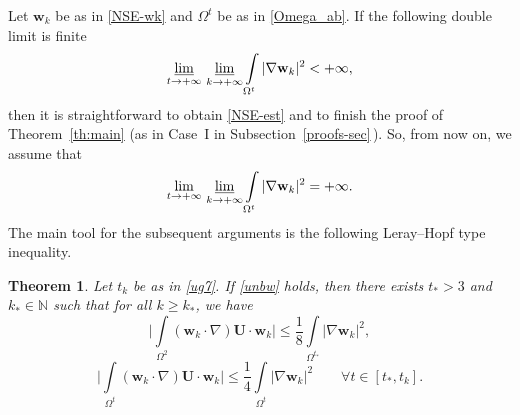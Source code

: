 \documentclass[11pt]{article}
\newtheorem{theorem}{Theorem}[section]
\numberwithin{equation}{section}
\numberwithin{figure}{section}
\newcommand{\N}{\mathbb{N}}
\def\N{{\mathbb N}}
\def\we{{\mathbf w}}
\begin{document}
Let $\we_k$ be as in \eqref{NSE-wk} and $\Omega^t$ be as in \eqref{Omega_ab}.
If the following double limit is finite
$$
\varliminf_{t\to +\infty} \, \varliminf_{k\to +\infty} \int\limits_{\Omega^t}|\nabla\we_{k}|^2 < +\infty,
$$
then it is straightforward to obtain \eqref{NSE-est} and to finish the proof of Theorem~\ref{th:main} (as in Case~I in \linebreak Subsection~\ref{proofs-sec}\,). So, from now on, we assume that
\begin{equation}\label{unbw}
	\lim_{t\to +\infty} \, \varliminf_{k\to +\infty} \int\limits_{\Omega^t}|\nabla\we_{k}|^2 = +\infty.
\end{equation}
The main tool for the subsequent arguments is the following Leray--Hopf type inequality. 

\begin{theorem}\label{prep-l2}
Let $t_k$ be as in \eqref{ug7}. If \eqref{unbw} holds, then there exists $t_*>3$ and $k_*\in\N$ such that
	for all $k\ge k_*$, we have
	\begin{equation}\label{gg11}\biggl|\int\limits_{\Omega^2}(\mathbf{w}_k \cdot \nabla) \mathbf{U}\cdot\we_k\biggr|\le
		\frac18\int\limits_{\Omega^{t_*}}|\nabla\we_k|^2, 
	\end{equation}
	\begin{equation}\label{gg10}\biggl|\int\limits_{\Omega^t}(\mathbf{w}_k \cdot \nabla) \mathbf{U}\cdot\we_k\biggr|\le
		\frac14\int\limits_{\Omega^t}|\nabla\we_k|^2\qquad \forall t\in [t_*, t_k].
	\end{equation}
\end{theorem}
\end{document}
